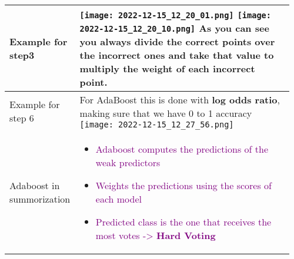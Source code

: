 \documentclass[main.tex,fontsize=8pt,paper=a4,paper=portrait,DIV=calc,]{scrartcl}
\begin{document}
\begin{table}[ht!]
\begin{tabular}{|m{0.2\linewidth}|m{0.755\linewidth}|}
\hline
Example for step3 & 
\vspace{2mm}
\texttt{[image: 2022-12-15\_12\_20\_01.png]}\newline
\texttt{[image: 2022-12-15\_12\_20\_10.png]}\newline
As you can see you always divide the correct points over the incorrect ones and take that value to multiply the weight of each incorrect point.
\\
\hline
Example for step 6& 
For AdaBoost this is done with \textbf{log odds ratio}, making sure that we have 0 to 1 accuracy\newline
\texttt{[image: 2022-12-15\_12\_27\_56.png]}
\\
\hline
Adaboost in summorization &
\vspace{2mm}
\begin{itemize}
\item \textcolor{purple}{Adaboost computes the predictions of the weak predictors}
\item \textcolor{purple}{Weights the predictions using the scores of each model}
\item \textcolor{purple}{Predicted class is the one that receives the most votes -> \textbf{Hard Voting}}
\vspace{-3mm}
\end{itemize} 
\\
\hline
\end{tabular}

\end{table}
\end{document}
